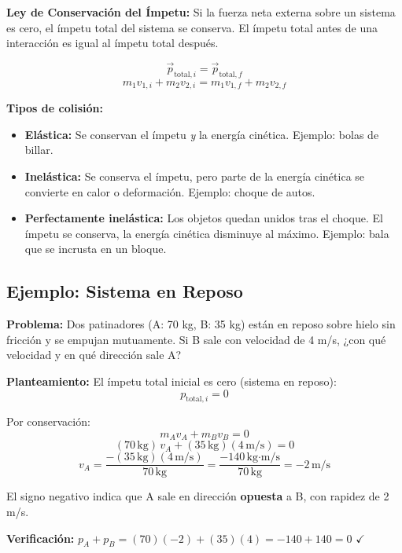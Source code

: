 \begin{seccion}
\begin{definicion}
    \textbf{Ley de Conservación del Ímpetu:} Si la fuerza neta externa sobre un sistema es cero, el ímpetu total del sistema se conserva. El ímpetu total antes de una interacción es igual al ímpetu total después.
\end{definicion}

\begin{ecuacion}
$$\vec{p}_{\text{total},i} = \vec{p}_{\text{total},f}$$
$$m_1 v_{1,i} + m_2 v_{2,i} = m_1 v_{1,f} + m_2 v_{2,f}$$
\end{ecuacion}

\textbf{Tipos de colisión:}
\begin{itemize}
    \item \textbf{Elástica:} Se conservan el ímpetu \textit{y} la energía cinética. Ejemplo: bolas de billar.
    \item \textbf{Inelástica:} Se conserva el ímpetu, pero parte de la energía cinética se convierte en calor o deformación. Ejemplo: choque de autos.
    \item \textbf{Perfectamente inelástica:} Los objetos quedan unidos tras el choque. El ímpetu se conserva, la energía cinética disminuye al máximo. Ejemplo: bala que se incrusta en un bloque.
\end{itemize}
\end{seccion}

\subsection{Ejemplo: Sistema en Reposo}

\begin{seccion}
\textbf{Problema:} Dos patinadores (A: 70 kg, B: 35 kg) están en reposo sobre hielo sin fricción y se empujan mutuamente. Si B sale con velocidad de 4 m/s, ¿con qué velocidad y en qué dirección sale A?

\textbf{Planteamiento:} El ímpetu total inicial es cero (sistema en reposo):
$$p_{\text{total},i} = 0$$

Por conservación:
$$m_A v_A + m_B v_B = 0$$
$$(70\,\text{kg})\,v_A + (35\,\text{kg})(4\,\text{m/s}) = 0$$
$$v_A = \frac{-(35\,\text{kg})(4\,\text{m/s})}{70\,\text{kg}} = \frac{-140\,\text{kg·m/s}}{70\,\text{kg}} = -2\,\text{m/s}$$

El signo negativo indica que A sale en dirección \textbf{opuesta} a B, con rapidez de 2 m/s.

\begin{nota}
    \textbf{Verificación:} $p_A + p_B = (70)(-2) + (35)(4) = -140 + 140 = 0$ $\checkmark$
\end{nota}
\end{seccion}

